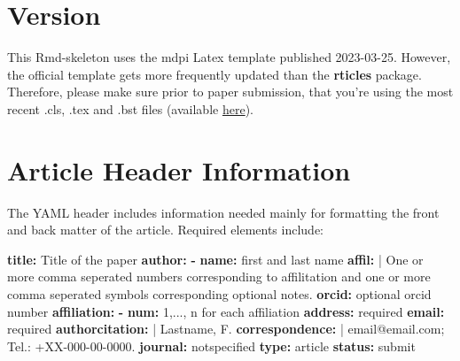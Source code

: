 \documentclass[notspecified,article,submit,moreauthors,pdftex]{Definitions/mdpi}
\newenvironment{Shaded}{\begin{snugshade}}{\end{snugshade}}
\newcommand{\AttributeTok}[1]{\textcolor[rgb]{0.13,0.29,0.53}{#1}}
\newcommand{\CharTok}[1]{\textcolor[rgb]{0.31,0.60,0.02}{#1}}
\newcommand{\FunctionTok}[1]{\textcolor[rgb]{0.13,0.29,0.53}{\textbf{#1}}}
\newcommand{\KeywordTok}[1]{\textcolor[rgb]{0.13,0.29,0.53}{\textbf{#1}}}
\newcommand{\NormalTok}[1]{#1}
\begin{document}

\hypertarget{version}{%
\section{Version}\label{version}}

This Rmd-skeleton uses the mdpi Latex template published 2023-03-25.
However, the official template gets more frequently updated than the
\textbf{rticles} package. Therefore, please make sure prior to paper
submission, that you're using the most recent .cls, .tex and .bst files
(available \href{http://www.mdpi.com/authors/latex}{here}).

\hypertarget{article-header-information}{%
\section{Article Header Information}\label{article-header-information}}

The YAML header includes information needed mainly for formatting the
front and back matter of the article. Required elements include:

\begin{Shaded}
\begin{Highlighting}[]
\FunctionTok{title}\KeywordTok{:}\AttributeTok{ Title of the paper}
\FunctionTok{author}\KeywordTok{:}
\AttributeTok{  }\KeywordTok{{-}}\AttributeTok{ }\FunctionTok{name}\KeywordTok{:}\AttributeTok{ first and last name}
\FunctionTok{    affil}\KeywordTok{: }\CharTok{|}
\NormalTok{      One or more comma seperated numbers corresponding to affilitation}
\NormalTok{      and one or more  comma seperated symbols corresponding }
\NormalTok{      optional notes.}
\AttributeTok{    }\FunctionTok{orcid}\KeywordTok{:}\AttributeTok{ optional orcid number}
\FunctionTok{affiliation}\KeywordTok{:}\AttributeTok{  }
\AttributeTok{  }\KeywordTok{{-}}\AttributeTok{ }\FunctionTok{num}\KeywordTok{:}\AttributeTok{ 1,..., n for each affiliation}
\AttributeTok{    }\FunctionTok{address}\KeywordTok{:}\AttributeTok{ required}
\AttributeTok{    }\FunctionTok{email}\KeywordTok{:}\AttributeTok{ required}
\FunctionTok{authorcitation}\KeywordTok{: }\CharTok{|}
\NormalTok{  Lastname, F.}
\FunctionTok{correspondence}\KeywordTok{: }\CharTok{|}
\NormalTok{  email@email.com; Tel.: +XX{-}000{-}00{-}0000.}
\FunctionTok{journal}\KeywordTok{:}\AttributeTok{ notspecified}
\FunctionTok{type}\KeywordTok{:}\AttributeTok{ article}
\FunctionTok{status}\KeywordTok{:}\AttributeTok{ submit}
\end{Highlighting}
\end{Shaded}
\end{document}
